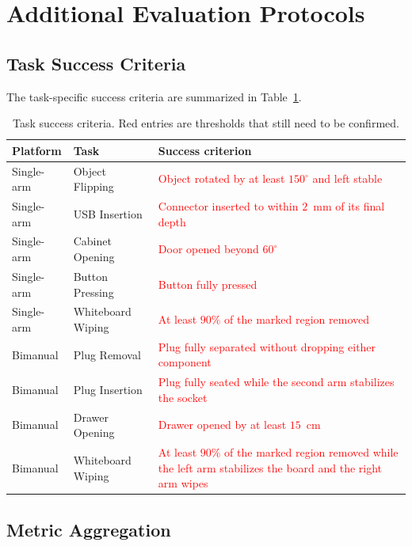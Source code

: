 \documentclass[conference]{IEEEtran}
\newcommand{\assumed}[1]{\textcolor{red}{#1}}
\begin{document}
\section{Additional Evaluation Protocols}

\subsection{Task Success Criteria}

The task-specific success criteria are summarized in Table~\ref{tab:supp_task_criteria}.

\begin{table}[t]
    \centering
    \small
    \setlength{\tabcolsep}{5pt}
    \caption{Task success criteria. Red entries are thresholds that still need to be confirmed.}
    \label{tab:supp_task_criteria}
    \begin{tabularx}{0.94\textwidth}{ll>{\raggedright\arraybackslash}X}
        \toprule
        \textbf{Platform} & \textbf{Task} & \textbf{Success criterion} \\
        \midrule
        Single-arm & Object Flipping & \assumed{Object rotated by at least $150^{\circ}$ and left stable} \\
        Single-arm & USB Insertion & \assumed{Connector inserted to within $2$~mm of its final depth} \\
        Single-arm & Cabinet Opening & \assumed{Door opened beyond $60^{\circ}$} \\
        Single-arm & Button Pressing & \assumed{Button fully pressed} \\
        Single-arm & Whiteboard Wiping & \assumed{At least $90\%$ of the marked region removed} \\
        \midrule
        Bimanual & Plug Removal & \assumed{Plug fully separated without dropping either component} \\
        Bimanual & Plug Insertion & \assumed{Plug fully seated while the second arm stabilizes the socket} \\
        Bimanual & Drawer Opening & \assumed{Drawer opened by at least $15$~cm} \\
        Bimanual & Whiteboard Wiping & \assumed{At least $90\%$ of the marked region removed while the left arm stabilizes the board and the right arm wipes} \\
        \bottomrule
    \end{tabularx}
\end{table}

\subsection{Metric Aggregation}
\end{document}
